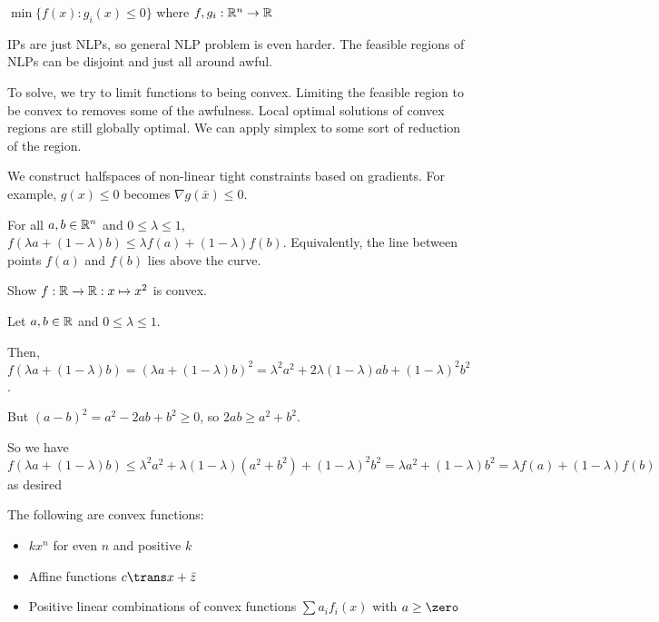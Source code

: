 \begin{defn}
  $\min\{f(x) : g_i(x) \leq 0\}$ where $f, g_i : \mathbb{R}^n \to \mathbb{R}$
\end{defn}

IPs are just NLPs, so general NLP problem is even harder.
The feasible regions of NLPs can be disjoint and just all around awful.

To solve, we try to limit functions to being convex.
Limiting the feasible region to be convex to removes some of the awfulness.
Local optimal solutions of convex regions are still globally optimal.
We can apply simplex to some sort of reduction of the region.

We construct halfspaces of non-linear tight constraints based on gradients.
For example, $g(x) \leq 0$ becomes $\nabla g(\bar x) \leq 0$.

\begin{defn}
  For all $a,b \in \mathbb{R}^n$ and $0 \leq \lambda \leq 1$,
  $f(\lambda a + (1-\lambda)b) \leq \lambda f(a) + (1-\lambda) f(b)$.
  Equivalently, the line between points $f(a)$ and $f(b)$ lies above the curve.
\end{defn}


\begin{example}
  Show $f : \mathbb{R} \to \mathbb{R} : x \mapsto x^2$ is convex.
\end{example}
\begin{prf}
  Let $a,b \in \mathbb{R}$ and $0 \leq \lambda \leq 1$.

  Then,
  $f(\lambda a + (1-\lambda)b)
    = (\lambda a + (1-\lambda)b)^2
    = \lambda^2 a^2 + 2\lambda(1-\lambda)ab + (1-\lambda)^2b^2$.

  But $(a-b)^2 = a^2 - 2ab + b^2 \geq 0$, so $2ab \geq a^2 + b^2$.

  So we have
  $f(\lambda a + (1-\lambda)b) \leq \lambda^2 a^2 + \lambda(1-\lambda)(a^2 + b^2) + (1-\lambda)^2b^2
    = \lambda a^2 + (1-\lambda)b^2
    = \lambda f(a) + (1-\lambda) f(b)$
  as desired
\end{prf}

\begin{lemma}
  The following are convex functions:
  \begin{itemize}[nosep]
    \item $kx^n$ for even $n$ and positive $k$
    \item Affine functions $c\trans x + \bar z$
    \item Positive linear combinations of convex functions $\sum a_i f_i(x)$
          with $a \geq \zero$
  \end{itemize}
\end{lemma}

